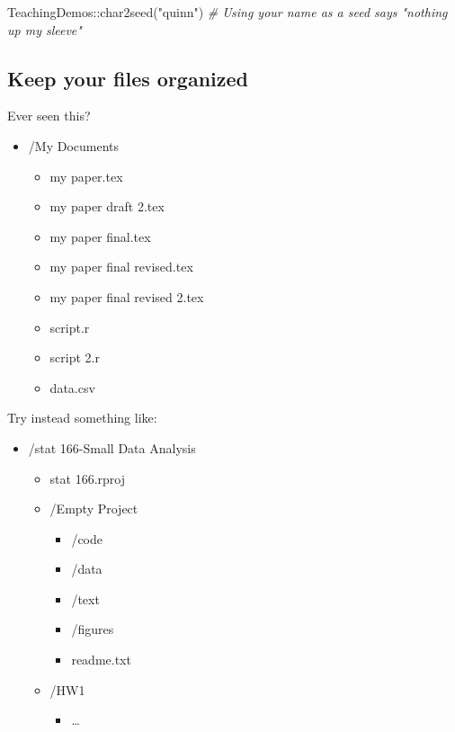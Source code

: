 \documentclass[
  letterpaper,
  DIV=11,
  numbers=noendperiod]{scrreprt}
\newenvironment{Shaded}{}{}
\newcommand{\CommentTok}[1]{\textcolor[rgb]{0.38,0.63,0.69}{\textit{#1}}}
\newcommand{\FunctionTok}[1]{\textcolor[rgb]{0.02,0.16,0.49}{#1}}
\newcommand{\NormalTok}[1]{#1}
\newcommand{\SpecialCharTok}[1]{\textcolor[rgb]{0.25,0.44,0.63}{#1}}
\newcommand{\StringTok}[1]{\textcolor[rgb]{0.25,0.44,0.63}{#1}}
\providecommand{\tightlist}{%
  \setlength{\itemsep}{0pt}\setlength{\parskip}{0pt}}\usepackage{longtable,booktabs,array}
\begin{document}
\begin{Shaded}
\begin{Highlighting}[]
\NormalTok{TeachingDemos}\SpecialCharTok{::}\FunctionTok{char2seed}\NormalTok{(}\StringTok{"quinn"}\NormalTok{) }
\CommentTok{\# Using your name as a seed says "nothing up my sleeve"}
\end{Highlighting}
\end{Shaded}

\subsection{Keep your files organized}\label{keep-your-files-organized}

Ever seen this?

\begin{itemize}
\tightlist
\item
  /My Documents

  \begin{itemize}
  \tightlist
  \item
    my paper.tex
  \item
    my paper draft 2.tex
  \item
    my paper final.tex
  \item
    my paper final revised.tex
  \item
    my paper final revised 2.tex
  \item
    script.r
  \item
    script 2.r
  \item
    data.csv
  \end{itemize}
\end{itemize}

Try instead something like:

\begin{itemize}
\tightlist
\item
  /stat 166-Small Data Analysis

  \begin{itemize}
  \tightlist
  \item
    stat 166.rproj
  \item
    /Empty Project

    \begin{itemize}
    \tightlist
    \item
      /code
    \item
      /data
    \item
      /text
    \item
      /figures
    \item
      readme.txt
    \end{itemize}
  \item
    /HW1

    \begin{itemize}
    \tightlist
    \item
      \ldots{}
    \end{itemize}
  \end{itemize}
\end{itemize}
\end{document}
